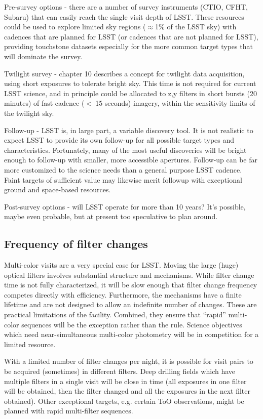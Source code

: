 	Pre-survey options - there are a number of survey instruments (CTIO, CFHT, Subaru) that can easily reach the single visit depth of LSST.  These resources could be used to explore limited sky regions ($\approx$1\% of the LSST sky) with cadences that are planned for LSST (or cadences that are not planned for LSST), providing touchstone datasets especially for the more common target types that will dominate the survey.
	
	Twilight survey - chapter 10 describes a concept for twilight data acquisition, using short exposures to tolerate bright sky.  This time is not required for current LSST science, and in principle could be allocated to z,y filters in short bursts (20 minutes) of fast cadence ($<~$15 seconds) imagery, within the sensitivity limits of the twilight sky.
	
	Follow-up - LSST is, in large part, a variable discovery tool.  It is not realistic to expect LSST to provide its own follow-up for all possible target types and characteristics. Fortunately, many of the most useful discoveries will be bright enough to follow-up with smaller, more accessible apertures.  Follow-up can be far more customized to the science needs than a general purpose LSST cadence.  Faint targets of sufficient value may likewise merit followup with exceptional  ground and space-based resources.
	
	Post-survey options - will LSST operate for more than 10 years? It's possible, maybe even probable, but at present too speculative to plan around.


\subsection{Frequency of filter changes}

Multi-color visits are a very special case for LSST.  Moving the large (huge) optical filters involves substantial structure and mechanisms.  While filter change time is not fully characterized, it will be slow enough that filter change frequency competes directly with efficiency.  Furthermore, the mechanisms have a finite lifetime and are not designed to allow an indefinite number of changes.  These are practical limitations of the facility. Combined, they ensure that ``rapid'' multi-color sequences will be the exception rather than the rule.  Science objectives which need near-simultaneous multi-color photometry will be in competition for a limited resource.  

With a limited number of filter changes per night, it is possible for visit pairs to be acquired (sometimes) in different filters.  Deep drilling fields which have multiple filters in a single visit will be close in time (all exposures in one filter will be obtained, then the filter changed and all the exposures in the next filter obtained).  Other exceptional targets, e.g. certain ToO observations, might be planned with rapid multi-filter sequences.  


